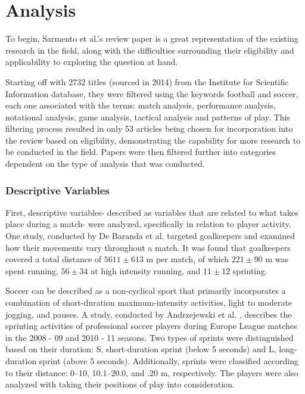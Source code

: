 \chapter{Analysis}

To begin, Sarmento et al.'s \cite{Sarmento2014} review paper is a great representation of the existing research in the field, along with the difficulties surrounding their eligibility and applicability to exploring the question at hand. 

Starting off with 2732 titles (sourced in 2014) from the Institute for Scientific Information database, they were filtered using the keywords football and soccer, each one associated with the terms: match analysis, performance analysis, notational analysis, game analysis, tactical analysis and patterns of play. This filtering process resulted in only 53 articles being chosen for incorporation into the review based on eligibility, demonstrating the capability for more research to be conducted in the field. Papers were then filtered further into categories dependent on the type of analysis that was conducted. 

\subsection{Descriptive Variables}
First, descriptive variables- described as variables that are related to what takes place during a match- were analyzed, specifically in relation to player activity. One study, conducted by De Baranda et al. \cite{DeBaranda2008} targeted goalkeepers and examined how their movements vary throughout a match. It was found that goalkeepers covered a total distance of $5611 \pm 613$ m per match, of which $221 \pm 90$ m was spent running, $56 \pm 34$ at high intensity running, and $11 \pm 12$ sprinting. 

Soccer can be described as a non-cyclical sport that primarily incorporates a combination of short-duration maximum-intensity activities, light to moderate jogging, and pauses. A study, conducted by Andrzejewski et al. \cite{Andrzejewski2013}, describes the sprinting activities of professional soccer players during Europe League matches in the 2008 - 09 and 2010 - 11 seasons. Two types of sprints were distinguished based on their duration: S, short-duration sprint (below 5 seconds) and L, long-duration sprint (above 5 seconds). Additionally, sprints were classified according to their distance: 0–10, 10.1–20.0, and .20 m, respectively. The players were also analyzed with taking their positions of play into consideration. 

